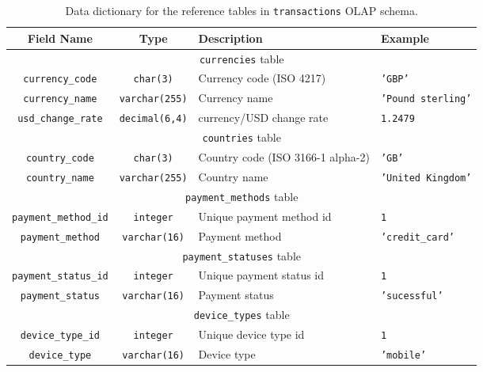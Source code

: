 \documentclass[11pt,a4paper,computermodern]{article}
\newcommand{\code}{\texttt}
\begin{document}
\begin{table}[ht]
	\centering
	\begin{threeparttable}
		\caption{Data dictionary for the reference tables in \code{transactions} OLAP schema.}
		\label{table:OLAP_ref}
		\begin{tabularx}{0.99\textwidth}{c c >{\centering\arraybackslash}X >{\centering\arraybackslash}X}
			\toprule
			Field Name & Type & Description & Example  \\
			\midrule
			\multicolumn{4}{c}{\code{currencies} table}\\
			\code{currency\_code} & \code{char(3)} & Currency code (ISO 4217) & \code{'GBP'} \\
			\code{currency\_name} & \code{varchar(255)} & Currency name & \code{'Pound sterling'} \\
			\code{usd\_change\_rate} & \code{decimal(6,4)} & currency/USD change rate & \code{1.2479} \\
			
			\midrule
			\multicolumn{4}{c}{\code{countries} table}\\
			\code{country\_code} & \code{char(3)} & Country code (ISO 3166-1 alpha-2) & \code{'GB'} \\
			\code{country\_name} & \code{varchar(255)} & Country name & \code{'United Kingdom'} \\
			
			\midrule
			\multicolumn{4}{c}{\code{payment\_methods} table}\\
			\code{payment\_method\_id} & \code{integer} & Unique payment method id & \code{1} \\
			\code{payment\_method} & \code{varchar(16)} & Payment method & \code{'credit\_card'} \\
			
			\midrule
			\multicolumn{4}{c}{\code{payment\_statuses} table}\\
			\code{payment\_status\_id} & \code{integer} & Unique payment status id & \code{1} \\
			\code{payment\_status} & \code{varchar(16)} & Payment status & \code{'sucessful'} \\
			
			\midrule
			\multicolumn{4}{c}{\code{device\_types} table}\\
			\code{device\_type\_id} & \code{integer} & Unique device type id & \code{1} \\
			\code{device\_type} & \code{varchar(16)} & Device type & \code{'mobile'} \\
			

\end{tabularx}
\end{threeparttable}
\end{table}
\end{document}
